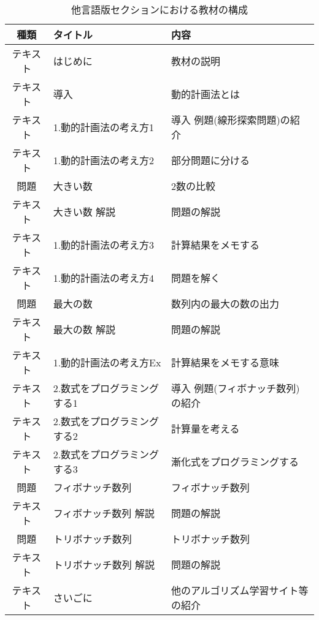 \begin{table}[H]
    \caption{他言語版セクションにおける教材の構成}
    \begin{center}
    \label{tab:composition other}
    \begin{tabular}{|c|l|l|} \hline
    
    種類 & タイトル & 内容 \\ \hline
    \hline
    テキスト & はじめに & 教材の説明\\ \hline

    テキスト & 導入 & 動的計画法とは \\ \hline
    テキスト & 1.動的計画法の考え方1 & 導入 例題(線形探索問題)の紹介 \\ \hline
    テキスト & 1.動的計画法の考え方2 & 部分問題に分ける \\ \hline
    問題 & 大きい数 & 2数の比較 \\ \hline
    テキスト & 大きい数 解説 & 問題の解説 \\ \hline
    テキスト & 1.動的計画法の考え方3 & 計算結果をメモする \\ \hline
    テキスト & 1.動的計画法の考え方4 & 問題を解く \\ \hline
    問題 & 最大の数 & 数列内の最大の数の出力 \\ \hline
    テキスト & 最大の数 解説 & 問題の解説 \\ \hline
    テキスト & 1.動的計画法の考え方Ex & 計算結果をメモする意味 \\ \hline
    テキスト & 2.数式をプログラミングする1 & 導入 例題(フィボナッチ数列)の紹介 \\ \hline
    テキスト & 2.数式をプログラミングする2 & 計算量を考える \\ \hline
    テキスト & 2.数式をプログラミングする3 & 漸化式をプログラミングする \\ \hline
    問題 & フィボナッチ数列 & フィボナッチ数列 \\ \hline
    テキスト & フィボナッチ数列 解説 & 問題の解説 \\ \hline
    問題 & トリボナッチ数列 & トリボナッチ数列 \\ \hline
    テキスト & トリボナッチ数列 解説& 問題の解説 \\ \hline
    テキスト & さいごに & 他のアルゴリズム学習サイト等の紹介 \\ \hline
    \end{tabular}
    \end{center}
\end{table}


